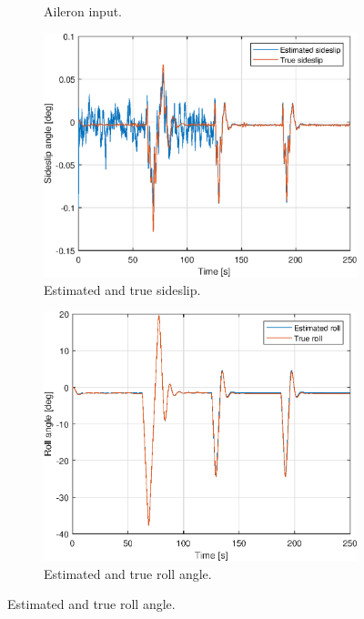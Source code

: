 \begin{figure}[ht]
\begin{subfigure}[b]{0.45\textwidth}
		\caption{Aileron input. }
		\label{fig:3g_delta_a_aileron}
	\end{subfigure}
	\begin{subfigure}[b]{0.45\textwidth}
		\includegraphics[width=\textwidth]{figures/3g/beta_sideslip.eps}
		\caption{Estimated and true sideslip. }
		\label{fig:3g_beta_sideslip}
	\end{subfigure}
	\begin{subfigure}[b]{0.45\textwidth}
		\includegraphics[width=\textwidth]{figures/3g/roll_phi.eps}
		\caption{Estimated and true roll angle. }
		\label{fig:3g_roll_angle}
    \end{subfigure}	

\end{figure}
